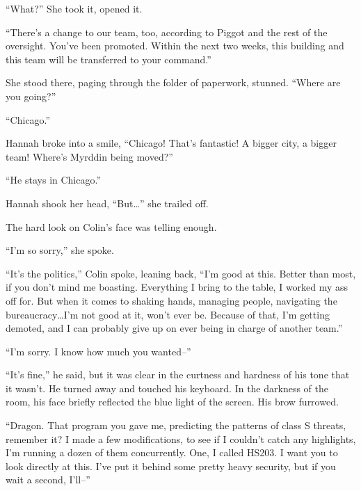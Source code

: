 ``What?''  She took it, opened it.



``There's a change to our team, too, according to Piggot and the rest of the oversight.  You've been promoted.  Within the next two weeks, this building and this team will be transferred to your command.''



She stood there, paging through the folder of paperwork, stunned.  ``Where are you going?''



``Chicago.''



Hannah broke into a smile, ``Chicago!  That's fantastic!  A bigger city, a bigger team!  Where's Myrddin being moved?''



``He stays in Chicago.''



Hannah shook her head, ``But\ldots'' she trailed off.



The hard look on Colin's face was telling enough.



``I'm so sorry,'' she spoke.



``It's the politics,'' Colin spoke, leaning back, ``I'm good at this.  Better than most, if you don't mind me boasting.  Everything I bring to the table, I worked my ass off for.  But when it comes to shaking hands, managing people, navigating the bureaucracy\ldots I'm not good at it, won't ever be.  Because of that, I'm getting demoted, and I can probably give up on ever being in charge of another team.''



``I'm sorry.  I know how much you wanted--''



``It's fine,'' he said, but it was clear in the curtness and hardness of his tone that it wasn't.  He turned away and touched his keyboard.  In the darkness of the room, his face briefly reflected the blue light of the screen.  His brow furrowed.



``Dragon.  That program you gave me, predicting the patterns of class S threats, remember it?  I made a few modifications, to see if I couldn't catch any highlights, I'm running a dozen of them concurrently.  One, I called HS203.  I want you to look directly at this.  I've put it behind some pretty heavy security, but if you wait a second, I'll--''



